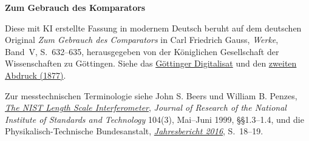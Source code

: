 \clearpage
{}
\begin{center}\textbf{Zum Gebrauch des Komparators}\end{center}
\noindent Diese mit KI erstellte Fassung in modernem Deutsch beruht auf dem deutschen Original \textit{Zum Gebrauch des Comparators} in Carl Friedrich Gauss, \textit{Werke}, Band~V, S.~632--635, herausgegeben von der Königlichen Gesellschaft der Wissenschaften zu Göttingen. Siehe das \href{https://gdz.sub.uni-goettingen.de/id/PPN236006339}{Göttinger Digitalisat} und den \href{https://archive.org/download/Werkecarlf05gausrich/page/n643}{zweiten Abdruck (1877)}.
\par\smallskip\noindent Zur messtechnischen Terminologie siehe John S. Beers und William B. Penzes, \href{https://nvlpubs.nist.gov/nistpubs/jres/104/3/html/j43bee.htm#c1pz3}{\textit{The NIST Length Scale Interferometer}}, \textit{Journal of Research of the National Institute of Standards and Technology} 104(3), Mai--Juni 1999, §§1.3--1.4, und die Physikalisch-Technische Bundesanstalt, \href{https://oar.ptb.de/files/download/460.2016.pdf}{\textit{Jahresbericht 2016}}, S.~18--19.
\clearpage
